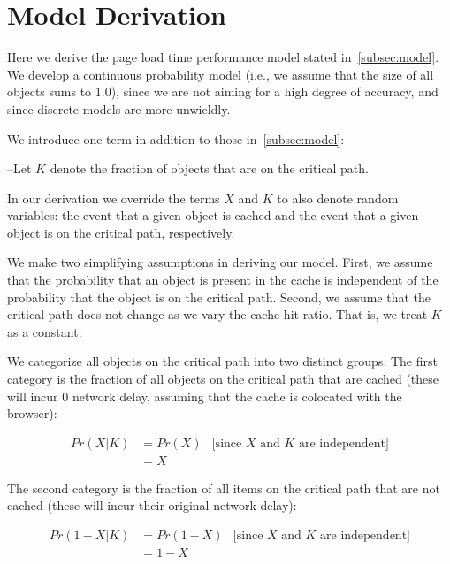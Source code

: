 \appendix
\section{Model Derivation}
\label{sec:appendix}

Here we derive the page load time performance model stated in~\ref{subsec:model}. We
develop a continuous probability model (i.e., we assume that the size of all
objects sums to 1.0), since we are not aiming for a high degree of accuracy,
and since discrete models are more unwieldly.


We introduce one term in addition to those in~\ref{subsec:model}:

\noindent--Let $K$ denote the fraction of objects that are on the critical path.

In our derivation we override the terms $X$ and $K$ to also denote random
variables: the event that a given object is cached and the event that a given
object is on the critical path, respectively.

We make two simplifying assumptions in deriving our model. First, we assume that the probability that an
object is present in the cache is independent of the probability that the object is on the critical path.
Second, we assume that the critical path does not change as we vary the cache hit
ratio. That is, we treat $K$ as a constant.

We categorize all objects on the critical path into two distinct groups.
The first category is the fraction of all objects on the critical path that are cached (these
will incur 0 network delay, assuming that the cache is colocated with the
browser):

\begin{align*}
Pr(X|K) & =  Pr(X) & \text{[since $X$ and $K$ are independent]} \\
& = X &
\end{align*}

The second category is the fraction of all items on the critical path that are not cached (these will incur their original network delay):

\begin{align*}
Pr(1-X | K) & = Pr(1-X) & \text{[since $X$ and $K$ are independent]} \\
& = 1-X &
\end{align*}

